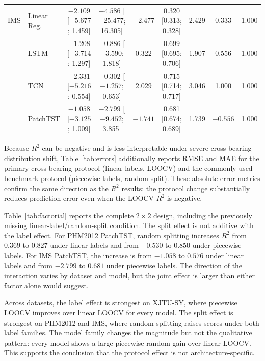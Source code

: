 \documentclass[pdflatex,sn-mathphys-num]{sn-jnl}
\begin{document}
\begin{table}[t]
{\begin{tabular}{llccccccl}
\midrule
IMS & Linear Reg. & $-2.109$ [$-5.677$; 1.459] & $-4.586$ [$-25.477$; 16.305] & $-2.477$ & 0.320 [0.313; 0.328] & 2.429 & 0.333 & 1.000 \\
 & LSTM & $-1.208$ [$-3.714$; 1.297] & $-0.886$ [$-3.590$; 1.818] & 0.322 & 0.699 [0.695; 0.706] & 1.907 & 0.556 & 1.000 \\
 & TCN & $-2.331$ [$-5.216$; 0.554] & $-0.302$ [$-1.257$; 0.653] & 2.029 & 0.715 [0.714; 0.717] & 3.046 & 1.000 & 1.000 \\
 & PatchTST & $-1.058$ [$-3.125$; 1.009] & $-2.799$ [$-9.452$; 3.855] & $-1.741$ & 0.681 [0.674; 0.689] & 1.739 & $-0.556$ & 1.000 \\
\bottomrule
\end{tabular}}
\end{table}

Because $R^2$ can be negative and is less interpretable under severe cross-bearing distribution shift, Table~\ref{tab:errors} additionally reports RMSE and MAE for the primary cross-bearing protocol (linear labels, LOOCV) and the commonly used benchmark protocol (piecewise labels, random split). These absolute-error metrics confirm the same direction as the $R^2$ results: the protocol change substantially reduces prediction error even when the LOOCV $R^2$ is negative.

Table~\ref{tab:factorial} reports the complete $2 \times 2$ design, including the previously missing linear-label/random-split condition. The split effect is not additive with the label effect. For PHM2012 PatchTST, random splitting increases $R^2$ from $0.369$ to $0.827$ under linear labels and from $-0.530$ to $0.850$ under piecewise labels. For IMS PatchTST, the increase is from $-1.058$ to $0.576$ under linear labels and from $-2.799$ to $0.681$ under piecewise labels. The direction of the interaction varies by dataset and model, but the joint effect is larger than either factor alone would suggest.

Across datasets, the label effect is strongest on XJTU-SY, where piecewise LOOCV improves over linear LOOCV for every model. The split effect is strongest on PHM2012 and IMS, where random splitting raises scores under both label families. The model family changes the magnitude but not the qualitative pattern: every model shows a large piecewise-random gain over linear LOOCV. This supports the conclusion that the protocol effect is not architecture-specific.
\end{document}
